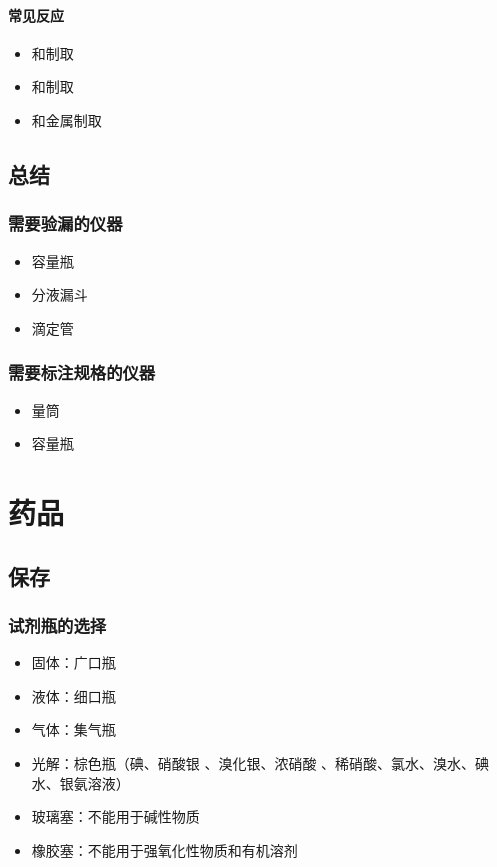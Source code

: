 \documentclass[a4paper]{article}
\begin{document}
	\paragraph{常见反应}
	\begin{itemize}
		\item {}和制取
		\item {}和制取
		\item {}和金属制取
	\end{itemize}
	
	
	\subsection{总结}
	
	\subsubsection{需要验漏的仪器}
	\begin{itemize}
		\item 容量瓶
		\item 分液漏斗
		\item 滴定管
	\end{itemize}
	\subsubsection{需要标注规格的仪器}
	\begin{itemize}
		\item 量筒
		\item 容量瓶
	\end{itemize}
	
	\clearpage
	\section{药品}
	\subsection{保存}
	\subsubsection{试剂瓶的选择}
	\begin{itemize}
		\item 固体：广口瓶
		\item 液体：细口瓶
		\item 气体：集气瓶
		\item 光解：棕色瓶（碘、硝酸银 、溴化银、浓硝酸 、稀硝酸、氯水、溴水、碘水、银氨溶液）
		\item 玻璃塞：不能用于碱性物质
		\item 橡胶塞：不能用于强氧化性物质和有机溶剂
	\end{itemize}
\end{document}
